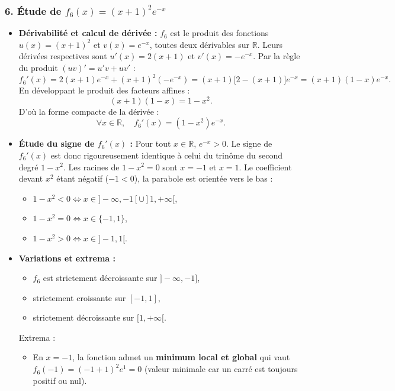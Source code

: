 \documentclass[11pt,a4paper]{article}
\newcommand{\R}{\mathbb{R}}
\begin{document}
\begin{correctionbox}[Exercice 3]
\subsubsection*{6. Étude de $f_6(x) = (x+1)^2 e^{-x}$}
\begin{itemize}
    \item \textbf{Dérivabilité et calcul de dérivée :}
    $f_6$ est le produit des fonctions $u(x) = (x+1)^2$ et $v(x) = e^{-x}$, toutes deux dérivables sur $\R$.
    Leurs dérivées respectives sont $u'(x) = 2(x+1)$ et $v'(x) = -e^{-x}$. Par la règle du produit $(uv)' = u'v + uv'$ :
    \[
    f_6'(x) = 2(x+1)e^{-x} + (x+1)^2 (-e^{-x}) = (x+1)\bigl[2 - (x+1)\bigr]e^{-x} = (x+1)(1 - x)e^{-x}.
    \]
    En développant le produit des facteurs affines :
    \[
    (x+1)(1-x) = 1 - x^2.
    \]
    D'où la forme compacte de la dérivée :
    \[
    \forall x \in \R, \quad f_6'(x) = (1 - x^2)e^{-x}.
    \]
    \item \textbf{Étude du signe de $f_6'(x)$ :}
    Pour tout $x \in \R$, $e^{-x} > 0$. Le signe de $f_6'(x)$ est donc rigoureusement identique à celui du trinôme du second degré $1 - x^2$.
    Les racines de $1 - x^2 = 0$ sont $x = -1$ et $x = 1$.
    Le coefficient devant $x^2$ étant négatif ($-1 < 0$), la parabole est orientée vers le bas :
    \begin{itemize}
        \item $1 - x^2 < 0 \iff x \in ]-\infty, -1[ \cup ]1, +\infty[$,
        \item $1 - x^2 = 0 \iff x \in \{-1, 1\}$,
        \item $1 - x^2 > 0 \iff x \in ]-1, 1[$.
    \end{itemize}
    \item \textbf{Variations et extrema :}
    \begin{itemize}
        \item $f_6$ est strictement décroissante sur $]-\infty, -1]$,
        \item strictement croissante sur $[-1, 1]$,
        \item strictement décroissante sur $[1, +\infty[$.
    \end{itemize}
    Extrema :
    \begin{itemize}
        \item En $x = -1$, la fonction admet un \textbf{minimum local et global} qui vaut $f_6(-1) = (-1+1)^2 e^1 = 0$ (valeur minimale car un carré est toujours positif ou nul).

\end{itemize}
\end{itemize}
\end{correctionbox}
\end{document}
